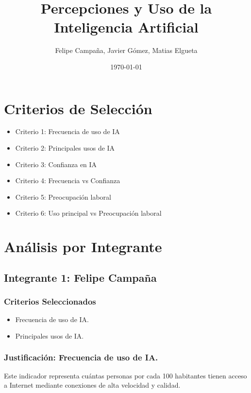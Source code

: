 \documentclass[12pt, a4paper]{article}
\title{Percepciones y Uso de la Inteligencia Artificial}
\author{Felipe Campaña, Javier Gómez, Matias Elgueta}
\date{\today\\[2cm]}
\begin{document}
\maketitle

\section*{Criterios de Selección}
\begin{itemize}
    \item Criterio 1: Frecuencia de uso de IA
    \item Criterio 2: Principales usos de IA	
    \item Criterio 3: Confianza en IA
    \item Criterio 4: Frecuencia vs Confianza
    \item Criterio 5: Preocupación laboral
    \item Criterio 6: Uso principal vs Preocupación laboral	
\end{itemize}



\section*{Análisis por Integrante}

\subsection*{Integrante 1: Felipe Campaña}

\subsubsection*{Criterios Seleccionados}
\begin{itemize}
    \item Frecuencia de uso de IA.
    \item Principales usos de IA.
\end{itemize}

\subsubsection*{Justificación: Frecuencia de uso de IA.}
Este indicador representa cuántas personas por cada 100 habitantes tienen acceso a Internet mediante conexiones de alta velocidad y calidad. 
\end{document}
